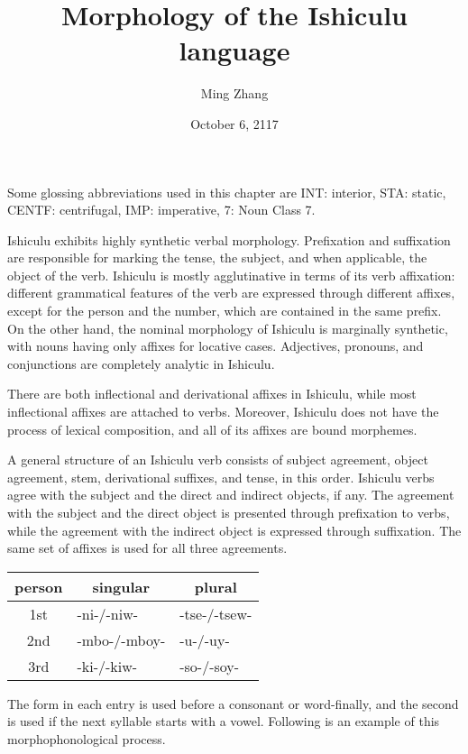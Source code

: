\documentclass[12pt, oneside]{article}
\title{Morphology of the Ishiculu language}
\author{Ming Zhang}
\date{October 6, 2117}
\begin{document}
\maketitle

Some glossing abbreviations used in this chapter are INT: interior, STA: static, CENTF: centrifugal, IMP: imperative, 7: Noun Class 7.

Ishiculu exhibits highly synthetic verbal morphology. Prefixation and suffixation are responsible for marking the tense, the subject, and when applicable, the object of the verb. Ishiculu is mostly agglutinative in terms of its verb affixation: different grammatical features of the verb are expressed through different affixes, except for the person and the number, which are contained in the same prefix. On the other hand, the nominal morphology of Ishiculu is marginally synthetic, with nouns having only affixes for locative cases. Adjectives, pronouns, and conjunctions are completely analytic in Ishiculu.

There are both inflectional and derivational affixes in Ishiculu, while most inflectional affixes are attached to verbs. Moreover, Ishiculu does not have the process of lexical composition, and all of its affixes are bound morphemes.

A general structure of an Ishiculu verb consists of subject agreement, object agreement, stem, derivational suffixes, and tense, in this order. Ishiculu verbs agree with the subject and the direct and indirect objects, if any. The agreement with the subject and the direct object is presented through prefixation to verbs, while the agreement with the indirect object is expressed through suffixation. The same set of affixes is used for all three agreements.

\begin{center}
\begin{tabular}{c|l|l}
\hline
person & \multicolumn{1}{c|}{singular} & \multicolumn{1}{c}{plural} \\
\hline
1st & -ni-/-niw- & -tse-/-tsew- \\
\hline
2nd & -mbo-/-mboy- & -u-/-uy- \\
\hline
3rd & -ki-/-kiw- & -so-/-soy- \\
\hline
\end{tabular}
\end{center}

The form in each entry is used before a consonant or word-finally, and the second is used if the next syllable starts with a vowel. Following is an example of this morphophonological process.
\end{document}
